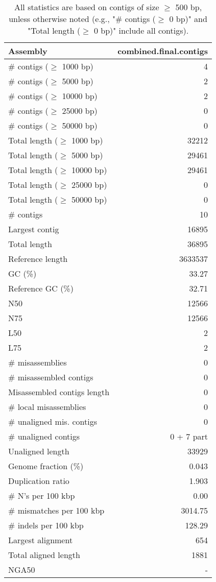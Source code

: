 \documentclass[12pt,a4paper]{article}
\begin{document}
\begin{table}[ht]
\begin{center}
\caption{All statistics are based on contigs of size $\geq$ 500 bp, unless otherwise noted (e.g., "\# contigs ($\geq$ 0 bp)" and "Total length ($\geq$ 0 bp)" include all contigs).}
\begin{tabular}{|l*{1}{|r}|}
\hline
Assembly & combined.final.contigs \\ \hline
\# contigs ($\geq$ 1000 bp) & 4 \\ \hline
\# contigs ($\geq$ 5000 bp) & 2 \\ \hline
\# contigs ($\geq$ 10000 bp) & 2 \\ \hline
\# contigs ($\geq$ 25000 bp) & 0 \\ \hline
\# contigs ($\geq$ 50000 bp) & 0 \\ \hline
Total length ($\geq$ 1000 bp) & 32212 \\ \hline
Total length ($\geq$ 5000 bp) & 29461 \\ \hline
Total length ($\geq$ 10000 bp) & 29461 \\ \hline
Total length ($\geq$ 25000 bp) & 0 \\ \hline
Total length ($\geq$ 50000 bp) & 0 \\ \hline
\# contigs & 10 \\ \hline
Largest contig & 16895 \\ \hline
Total length & 36895 \\ \hline
Reference length & 3633537 \\ \hline
GC (\%) & 33.27 \\ \hline
Reference GC (\%) & 32.71 \\ \hline
N50 & 12566 \\ \hline
N75 & 12566 \\ \hline
L50 & 2 \\ \hline
L75 & 2 \\ \hline
\# misassemblies & 0 \\ \hline
\# misassembled contigs & 0 \\ \hline
Misassembled contigs length & 0 \\ \hline
\# local misassemblies & 0 \\ \hline
\# unaligned mis. contigs & 0 \\ \hline
\# unaligned contigs & 0 + 7 part \\ \hline
Unaligned length & 33929 \\ \hline
Genome fraction (\%) & 0.043 \\ \hline
Duplication ratio & 1.903 \\ \hline
\# N's per 100 kbp & 0.00 \\ \hline
\# mismatches per 100 kbp & 3014.75 \\ \hline
\# indels per 100 kbp & 128.29 \\ \hline
Largest alignment & 654 \\ \hline
Total aligned length & 1881 \\ \hline
NGA50 & - \\ \hline
\end{tabular}
\end{center}
\end{table}
\end{document}
